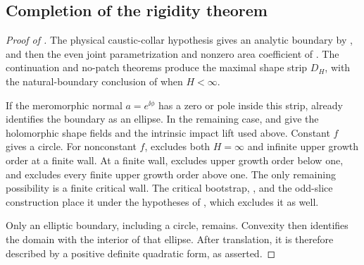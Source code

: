 \subsection{Completion of the rigidity theorem}

\begin{proof}[Proof of ]
The physical caustic-collar hypothesis gives an analytic boundary by
, and then the even joint parametrization and
nonzero area coefficient of .
The continuation and no-patch theorems produce the maximal shape
strip \(D_H\), with the natural-boundary conclusion of
 when \(H<\infty\).

If the meromorphic normal \(a=e^{\ii\phi}\) has a zero or pole
inside this strip,  already
identifies the boundary as an ellipse.  In the remaining case,
 and  give the holomorphic
shape fields and the intrinsic impact lift used above.  Constant
\(f\) gives a circle.  For nonconstant \(f\),
 excludes both \(H=\infty\)
and infinite upper growth order at a finite wall.  At a finite wall,
 excludes upper growth order below
one, and  excludes every
finite upper growth order above one.  The only remaining possibility
is a finite critical wall.  The critical bootstrap,
, and the odd-slice construction place
it under the hypotheses of , which excludes it
as well.

Only an elliptic boundary, including a circle, remains.  Convexity
then identifies the domain with the interior of that ellipse.
After translation, it is therefore described by a positive definite
quadratic form, as asserted.
\end{proof}
